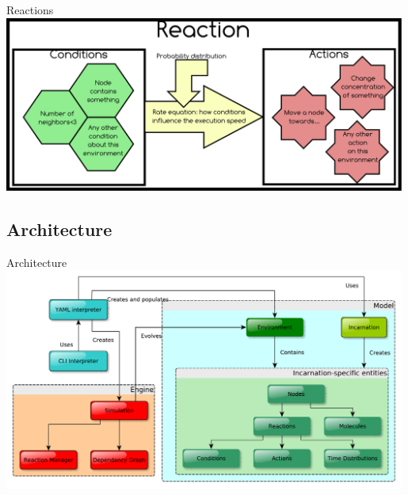 \documentclass[presentation]{beamer}
\begin{document}
\begin{frame}{Reactions}
  \centering
  \includegraphics[width=0.99\textwidth]{img/reaction}
\end{frame}

\subsection{Architecture}
\begin{frame}{Architecture}
  \centering
  \includegraphics[width=0.99\textwidth]{img/structure}
\end{frame}

% 
\end{document}
